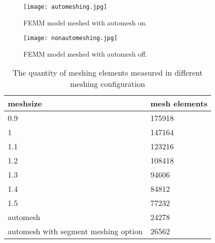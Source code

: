 \documentclass[a4paper]{IEEEtran}
\begin{document}
{\begin{figure}[!ht]
\begin{centering}
\texttt{[image: automeshing.jpg]} 
\par\end{centering}   
\caption{FEMM model meshed with automesh on.\label{automesh}}
\end{figure} 

\begin{figure}[!ht]
\begin{centering}
\texttt{[image: nonautomeshing.jpg]} 
\par\end{centering}   
\caption{FEMM model meshed with automesh off.\label{nonautomesh}}
\end{figure}

\begin{table}[H]
	\centering
	\caption{The quantity of meshing elements measured in different meshing configuration}
	\label{table:2}
	\begin{tabular}{|p{4.5cm}p{2cm}|} 
	\hline
	meshsize & mesh elements \\
	\hline
	\hline
	0.9 & 	175918 \\
	\hline
	1 	& 	147164 \\
	\hline
	1.1	&	123216 \\
	\hline
	1.2	&	108418 \\
	\hline
	1.3 & 	94606  \\
	\hline
	1.4 & 	84812  \\
	\hline
	1.5 & 	77232  \\
	\hline
	automesh & 24278 \\
	\hline
	automesh with segment meshing option & 26562 \\
	\hline
	\end{tabular}

\end{table}


}
\end{document}
